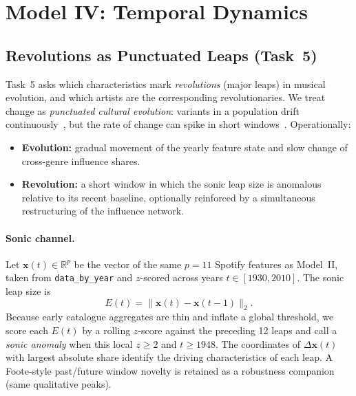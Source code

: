\section{Model IV: Temporal Dynamics}\label{sec:model-temporal}

\subsection{Revolutions as Punctuated Leaps (Task~5)}\label{subsec:t5-revolutions}

Task~5 asks which characteristics mark \emph{revolutions} (major leaps) in
musical evolution, and which artists are the corresponding revolutionaries.
We treat change as \emph{punctuated cultural evolution}: variants in a
population drift continuously~\cite{savage2019cultural}, but the rate of
change can spike in short windows~\cite{mauch2015evolution}. Operationally:

\begin{itemize}[leftmargin=1.2em,itemsep=0.2em]
  \item \textbf{Evolution:} gradual movement of the yearly feature state and
  slow change of cross-genre influence shares.
  \item \textbf{Revolution:} a short window in which the sonic leap size is
  anomalous relative to its recent baseline, optionally reinforced by a
  simultaneous restructuring of the influence network.
\end{itemize}

\paragraph{Sonic channel.}
Let \(\mathbf{x}(t)\in\mathbb{R}^{p}\) be the vector of the same \(p=11\)
Spotify features as Model~II, taken from \texttt{data\_by\_year} and
\(z\)-scored across years \(t\in[1930,2010]\). The sonic leap size is
\begin{equation}\label{eq:t5-E}
E(t)=\|\mathbf{x}(t)-\mathbf{x}(t-1)\|_2.
\end{equation}
Because early catalogue aggregates are thin and inflate a global threshold,
we score each \(E(t)\) by a rolling \(z\)-score against the preceding
12 leaps and call a \emph{sonic anomaly} when this local \(z\geq 2\) and
\(t\geq 1948\). The coordinates of \(\Delta\mathbf{x}(t)\) with largest
absolute share identify the driving characteristics of each leap. A Foote-style
past/future window novelty is retained as a robustness companion (same
qualitative peaks).

